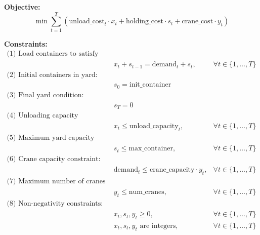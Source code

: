 \documentclass{article}
\begin{document}
\textbf{Objective:}
\[
\min \sum_{t=1}^{T} \left( \text{unload\_cost}_t \cdot x_t + \text{holding\_cost} \cdot s_t + \text{crane\_cost} \cdot y_t \right)
\]

\textbf{Constraints:}
\begin{align*}
\text{(1) Load containers to satisfy demand:} &\\
& x_t + s_{t-1} = \text{demand}_t + s_t, & \forall t \in \{1, \dots, T\}\\
\text{(2) Initial containers in yard:} &\\
& s_0 = \text{init\_container}\\
\text{(3) Final yard condition:} &\\
& s_T = 0\\
\text{(4) Unloading capacity constraint:} &\\
& x_t \leq \text{unload\_capacity}_t, & \forall t \in \{1, \dots, T\}\\
\text{(5) Maximum yard capacity constraint:} &\\
& s_t \leq \text{max\_container}, & \forall t \in \{1, \dots, T\}\\
\text{(6) Crane capacity constraint:} &\\
& \text{demand}_t \leq \text{crane\_capacity} \cdot y_t, & \forall t \in \{1, \dots, T\}\\
\text{(7) Maximum number of cranes constraint:} &\\
& y_t \leq \text{num\_cranes}, & \forall t \in \{1, \dots, T\}\\
\text{(8) Non-negativity constraints:} &\\
& x_t, s_t, y_t \geq 0, & \forall t \in \{1, \dots, T\} \\
& x_t, s_t, y_t \text{ are integers}, & \forall t \in \{1, \dots, T\}
\end{align*}
\end{document}
